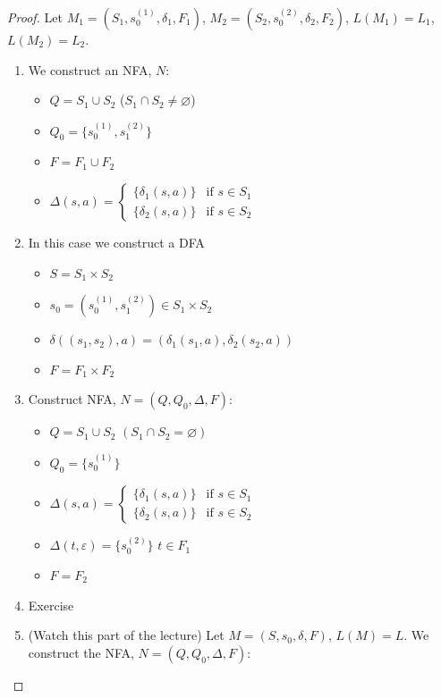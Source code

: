 \documentclass{article}
\begin{document}
\begin{proof}
Let $M_1 = (S_1, s_0^{(1)}, \delta_1, F_1)$, $M_2 = (S_2, s_0^{(2)}, \delta_2, F_2)$, $L(M_1) = L_1$, $L(M_2) = L_2$.
\begin{enumerate}
    \item We construct an NFA, $N$:
    \begin{itemize}
        \item $Q = S_1 \cup S_2$ ($S_1 \cap S_2 \ne \varnothing$)
        \item $Q_0 = \{s_0^{(1)},s_1^{(2)}\}$
        \item $F = F_1 \cup F_2$
        \item $\Delta(s,a) = \begin{cases}
        \{\delta_1(s,a)\} &\text{if } s\in S_1\\
        \{\delta_2(s,a)\} &\text{if } s\in S_2
        \end{cases}$
    \end{itemize}
    \item In this case we construct a DFA
    \begin{itemize}
        \item $S = S_1 \times S_2$
        \item $s_0 = (s_0^{(1)},s_1^{(2)}) \in S_1 \times S_2$
        \item $\delta((s_1,s_2), a) = (\delta_1(s_1,a),\delta_2(s_2,a))$
        \item $F = F_1 \times F_2$
    \end{itemize}
    \item Construct NFA, $N = (Q, Q_0, \Delta, F)$:
    \begin{itemize}
        \item $Q = S_1 \cup S_2$ $(S_1 \cap S_2 = \varnothing)$
        \item $Q_0 = \{s_0^{(1)}\}$
        \item $\Delta(s,a) = \begin{cases}
        \{\delta_1(s,a)\} &\text{if } s\in S_1\\
        \{\delta_2(s,a)\} &\text{if } s\in S_2
        \end{cases}$
        \item $\Delta(t, \varepsilon) = \{s_0^{(2)}\}$ $t\in F_1$
        \item $F = F_2$
    \end{itemize}
    \item Exercise
    \item (Watch this part of the lecture) Let $M = (S, s_0, \delta, F)$, $L(M) = L$. We construct the NFA, $N = (Q, Q_0, \Delta, F)$:

\end{enumerate}
\end{proof}
\end{document}
